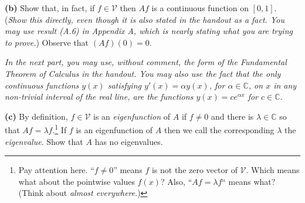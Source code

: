 \documentclass[12pt]{amsart}
\newcommand{\cV}{\mathcal{V}}
\newcommand{\CC}{\mathbb{C}}
\newcommand{\epart}[1]{\medskip\noindent\textbf{(#1)}\quad }
\newcommand{\nex}{\medskip\noindent}
\begin{document}
\medskip
\epart{b}  Show that, in fact, if $f\in \cV$ then $Af$ is a continuous function on $[0,1]$.  (\emph{Show this directly, even though it is also stated in the handout as a fact.  You may use result (A.6) in Appendix A, which is nearly stating what you are trying to prove.})  Observe that $(Af)(0)=0$.

\nex \emph{In the next part, you may use, without comment, the form of the Fundamental Theorem of Calculus in the handout.  You may also use the fact that the only continuous functions $y(x)$ satisfying $y'(x) = \alpha y(x)$, for $\alpha\in\CC$, on $x$ in any non-trivial interval of the real line, are the functions $y(x) = c e^{\alpha x}$ for $c\in\CC$.}

\medskip

\epart{c}  By definition, $f \in \cV$ is an \emph{eigenfunction} of $A$ if $f\ne 0$ and there is $\lambda \in \CC$ so that $Af=\lambda f$.\footnote{Pay attention here. ``$f\ne 0$'' means $f$ is not the zero vector of $\cV$.  Which means what about the pointwise values $f(x)$?  Also, ``$Af=\lambda f$`` means what?  (Think about \emph{almost everywhere}.)}  If $f$ is an eigenfunction of $A$ then we call the corresponding $\lambda$ the \emph{eigenvalue}.  Show that $A$ has no eigenvalues.
\end{document}
